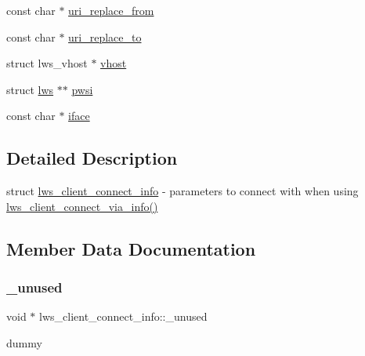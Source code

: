 \begin{DoxyCompactItemize}
\item 
const char $\ast$ \hyperlink{structlws__client__connect__info_acb68c628d1c0a17880c6159192a3bbb4}{uri\+\_\+replace\+\_\+from}
\item 
const char $\ast$ \hyperlink{structlws__client__connect__info_ad4a7803f2d9e52048ff0226e84c2bdcf}{uri\+\_\+replace\+\_\+to}
\item 
struct lws\+\_\+vhost $\ast$ \hyperlink{structlws__client__connect__info_a366c69fbb3cc5a4afa75e210905227e0}{vhost}
\item 
struct \hyperlink{structlws}{lws} $\ast$$\ast$ \hyperlink{structlws__client__connect__info_ada719bd4a16077101eec9664a0d68f65}{pwsi}
\item 
const char $\ast$ \hyperlink{structlws__client__connect__info_a30e3978f38acb3e6472d66ef6202f77b}{iface}
\end{DoxyCompactItemize}


\subsection{Detailed Description}
struct \hyperlink{structlws__client__connect__info}{lws\+\_\+client\+\_\+connect\+\_\+info} -\/ parameters to connect with when using \hyperlink{group__client_ga0c966136905f467816307cfba6deb5fd}{lws\+\_\+client\+\_\+connect\+\_\+via\+\_\+info()} 

\subsection{Member Data Documentation}
\mbox{\label{structlws__client__connect__info_a4ab4a7e1a248e7fdaab5f89a2bf4ed28}} 
\subsubsection{\texorpdfstring{\+\_\+unused}{\_unused}}
{\footnotesize\ttfamily void $\ast$ lws\+\_\+client\+\_\+connect\+\_\+info\+::\+\_\+unused}

dummy \mbox{\label{structlws__client__connect__info_a1de593a0b98db84031b665bdc4ba51d2}} 
